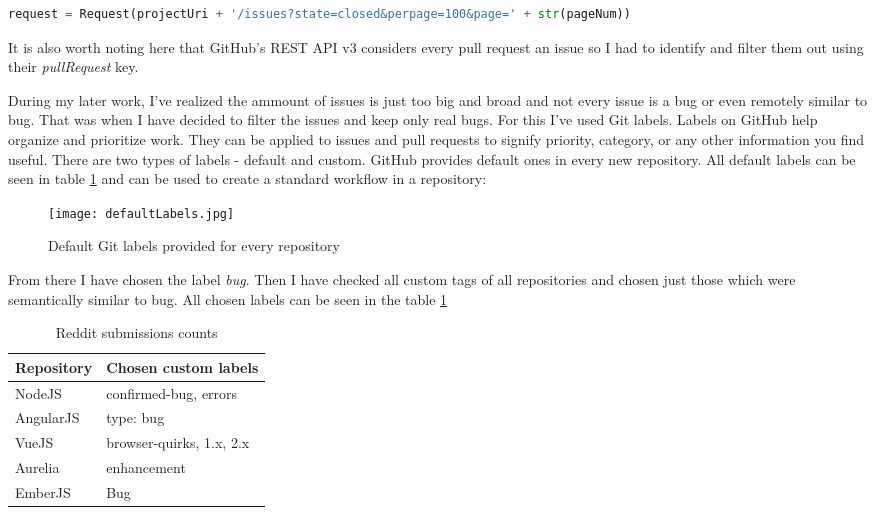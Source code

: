 \begin{lstlisting}[caption={Requesting 100 closed issues},label={lst:issuesEndpoint},language=Python]
request = Request(projectUri + '/issues?state=closed&perpage=100&page=' + str(pageNum))
\end{lstlisting}

It is also worth noting here that GitHub's REST API v3 considers every pull request an issue so I had to identify and filter them out using their \textit{pullRequest} key.

During my later work, I've realized the ammount of issues is just too big and broad and not every issue is a bug or even remotely similar to bug. That was when I have decided to filter the issues and keep only real bugs. For this I've used Git labels. Labels on GitHub help organize and prioritize work. They can be applied to issues and pull requests to signify priority, category, or any other information you find useful. There are two types of labels - default and custom. GitHub provides default ones in every new repository. All default labels can be seen in table \ref{fig:defaultLabels} and can be used to create a standard workflow in a repository:

\begin{figure}[H]%
    \centering
	\texttt{[image: defaultLabels.jpg]}
    \caption{Default Git labels provided for every repository}%
    \label{fig:defaultLabels}%
\end{figure}

From there I have chosen the label \textit{bug}. Then I have checked all custom tags of all repositories and chosen just those which were semantically similar to bug. All chosen labels can be seen in the table \ref{table:allGitBugLabels}


\begin{table}[H]
\centering
\begin{tabular}{ |p{3cm}||p{6cm}|}
 \hline
\textbf{ Repository }& \textbf{Chosen custom labels}\\
 \hline
 NodeJS   & confirmed-bug, errors \\ \hline
 AngularJS &   type: bug \\ \hline
 VueJS & browser-quirks, 1.x, 2.x\\ \hline
 Aurelia & enhancement\\ \hline
 EmberJS & Bug\\ \hline
\end{tabular}
\caption{Reddit submissions counts}
\label{table:allGitBugLabels}
\end{table}

